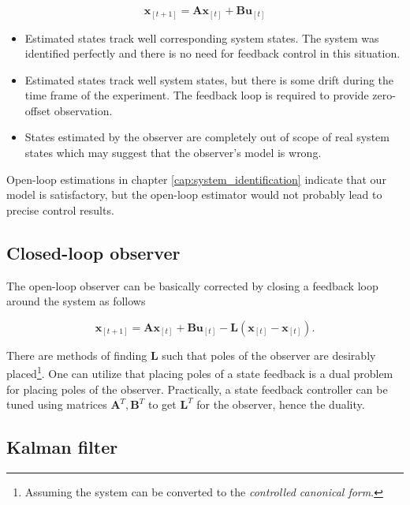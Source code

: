 \begin{equation}
\textbf{\^x}_{[t+1]} = \textbf{A}\textbf{\^x}_{[t]} + \textbf{B}\textbf{u}_{[t]}
\label{eq:openloop_observer}
\end{equation}

\begin{itemize}
\item Estimated states track well corresponding system states. The system was identified perfectly and there is no need for feedback control in this situation.
\item Estimated states track well system states, but there is some drift during the time frame of the experiment. The feedback loop is required to provide zero-offset observation.
\item States estimated by the observer are completely out of scope of real system states which may suggest that the observer's model is wrong.
\end{itemize}

Open-loop estimations in chapter \ref{cap:system_identification} indicate that our model is satisfactory, but the open-loop estimator would not probably lead to precise control results.

\subsection{Closed-loop observer}

The open-loop observer can be basically corrected by closing a feedback loop around the system as follows

\begin{equation}
\textbf{\^x}_{[t+1]} = \textbf{A}\textbf{\^x}_{[t]} + \textbf{B}\textbf{u}_{[t]} - \textbf{L}\left(\textbf{x}_{[t]} - \textbf{\^x}_{[t]}\right).
\label{eq:closed_loop_observer}
\end{equation}

There are methods of finding $\textbf{L}$ such that poles of the observer are desirably placed\footnote{Assuming the system can be converted to the \textit{controlled canonical form}.}. One can utilize that placing poles of a state feedback is a dual problem for placing poles of the observer. Practically, a state feedback controller can be tuned using matrices $\textbf{A}^T, \textbf{B}^T$ to get $\textbf{L}^T$ for the observer, hence the duality.

\subsection{Kalman filter}
\label{cap:kalman_filter_theory}

